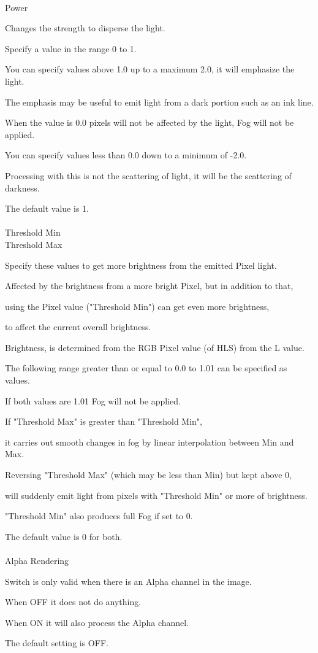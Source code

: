 \documentclass[a4paper,12pt]{article}
\begin{document}
\ \vspace{-0.2em}
\par
\noindent Power\par
Changes the strength to disperse the light.\par
Specify a value in the range 0 to 1.\par
You can specify values above 1.0 up to a maximum 2.0, it will emphasize the light.\par
The emphasis may be useful to emit light from a dark portion such as an ink line.\par
When the value is 0.0 pixels will not be affected by the light, Fog will not be applied.\par
You can specify values less than 0.0 down to a minimum of -2.0.\par
Processing with this is not the scattering of light, it will be the scattering of darkness.\par
The default value is 1.\\
\\
Threshold Min\\
Threshold Max\par
Specify these values to get more brightness from the emitted Pixel light.\\
\par
Affected by the brightness from a more bright Pixel, but in addition to that,\par
using the Pixel value ("Threshold Min") can get even more brightness,\par
to affect the current overall brightness.\par
Brightness, is determined from the RGB Pixel value (of HLS) from the L value.\\
\par
The following range greater than or equal to 0.0 to 1.01 can be specified as values.\\
\par
If both values are 1.01 Fog will not be applied.\\
\par
If "Threshold Max" is greater than "Threshold Min",\par
it carries out smooth changes in fog by linear interpolation between Min and Max.\\
\par
Reversing "Threshold Max" (which may be less than Min) but kept above 0,\par
will suddenly emit light from pixels with "Threshold Min" or more of brightness.\par
"Threshold Min" also produces full Fog if set to 0.\\
\par
The default value is 0 for both.\\
\\
Alpha Rendering\par
Switch is only valid when there is an Alpha channel in the image.\par
When OFF it does not do anything.\par
When ON it will also process the Alpha channel.\par
The default setting is OFF.
\end{document}
